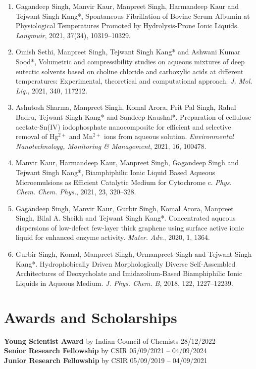 \documentclass[11pt,a4paper]{article}
\begin{document}
\begin{enumerate}[leftmargin=*,label=\arabic*.,itemsep=5pt]
\item Gagandeep Singh, Manvir Kaur, Manpreet Singh, Harmandeep Kaur and Tejwant Singh Kang*, Spontaneous Fibrillation of Bovine Serum Albumin at Physiological Temperatures Promoted by Hydrolysis-Prone Ionic Liquids. \textit{Langmuir}, 2021, 37(34), 10319--10329.
\item Omish Sethi, Manpreet Singh, Tejwant Singh Kang* and Ashwani Kumar Sood*, Volumetric and compressibility studies on aqueous mixtures of deep eutectic solvents based on choline chloride and carboxylic acids at different temperatures: Experimental, theoretical and computational approach. \textit{J. Mol. Liq.}, 2021, 340, 117212.
\item Ashutosh Sharma, Manpreet Singh, Komal Arora, Prit Pal Singh, Rahul Badru, Tejwant Singh Kang* and Sandeep Kaushal*. Preparation of cellulose acetate-Sn(IV) iodophosphate nanocomposite for efficient and selective removal of Hg$^{2+}$ and Mn$^{2+}$ ions from aqueous solution. \textit{Environmental Nanotechnology, Monitoring \& Management}, 2021, 16, 100478.
\item Manvir Kaur, Harmandeep Kaur, Manpreet Singh, Gagandeep Singh and Tejwant Singh Kang*, Biamphiphilic Ionic Liquid Based Aqueous Microemulsions as Efficient Catalytic Medium for Cytochrome c. \textit{Phys. Chem. Chem. Phys.}, 2021, 23, 320--328.
\item Gagandeep Singh, Manvir Kaur, Gurbir Singh, Komal Arora, Manpreet Singh, Bilal A. Sheikh and Tejwant Singh Kang*. Concentrated aqueous dispersions of low-defect few-layer thick graphene using surface active ionic liquid for enhanced enzyme activity. \textit{Mater. Adv.}, 2020, 1, 1364.
\item Gurbir Singh, Komal, Manpreet Singh, Ormanpreet Singh and Tejwant Singh Kang*. Hydrophobically Driven Morphologically Diverse Self-Assembled Architectures of Deoxycholate and Imidazolium-Based Biamphiphilic Ionic Liquids in Aqueous Medium. \textit{J. Phys. Chem. B}, 2018, 122, 1227--12239.
\end{enumerate}

\vspace{0.6cm}

\section*{Awards and Scholarships}
\textbf{Young Scientist Award} by Indian Council of Chemists \hfill 28/12/2022 \\
\textbf{Senior Research Fellowship} by CSIR \hfill 05/09/2021 -- 04/09/2024\\
\textbf{Junior Research Fellowship} by CSIR \hfill 05/09/2019 -- 04/09/2021
\end{document}
